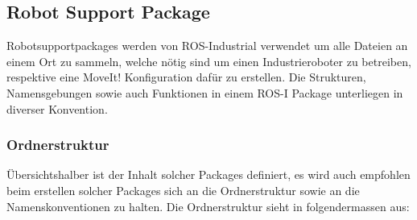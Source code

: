 \subsection{Robot Support Package}
Robotsupportpackages werden von ROS-Industrial verwendet um alle Dateien an einem Ort zu sammeln, welche nötig sind um einen Industrieroboter zu betreiben, respektive eine MoveIt! Konfiguration dafür zu erstellen. Die Strukturen, Namensgebungen sowie auch Funktionen in einem ROS-I Package unterliegen in diverser Konvention. 
\subsubsection{Ordnerstruktur}
Übersichtshalber ist der Inhalt solcher Packages definiert, es wird auch empfohlen beim erstellen solcher Packages sich an die Ordnerstruktur sowie an die Namenskonventionen zu halten. Die Ordnerstruktur sieht in folgendermassen aus:\\
